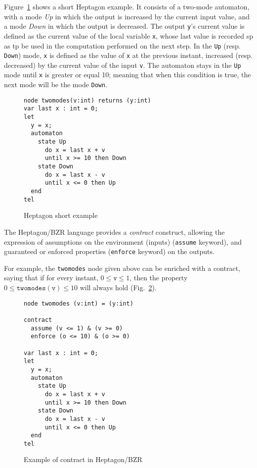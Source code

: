 \documentclass[a4paper]{article}
\begin{document}
Figure~\ref{fig:hept-exple} shows a short Heptagon example. It
consists of a two-mode automaton, with a mode \emph{Up} in which the
output is increased by the current input value, and a mode \emph{Down}
in which the output is decreased.  The output \texttt{y}'s current
value is defined as the current value of the local variable
\texttt{x}, whose last value is recorded sp as tp be used in the
computation performed on the next step. In the \texttt{Up}
(resp. \texttt{Down}) mode, \texttt{x} is defined as the value of
\texttt{x} at the previous instant, increased (resp. decreased) by the
current value of the input \texttt{v}. The automaton stays in the
\texttt{Up} mode until \texttt{x} is greater or equal 10; meaning that
when this condition is true, the next mode will be the mode
\texttt{Down}.

\begin{figure}[hbp]
  \centering
\begin{lstlisting}
node twomodes(v:int) returns (y:int)
var last x : int = 0;
let
  y = x;
  automaton
    state Up
      do x = last x + v
      until x >= 10 then Down
    state Down
      do x = last x - v
      until x <= 0 then Up
  end
tel
\end{lstlisting}

  \caption{Heptagon short example}
  \label{fig:hept-exple}
\end{figure}

The Heptagon/BZR language provides a \emph{contract} construct,
allowing the expression of assumptions on the environment (inputs)
(\texttt{assume} keyword), and guaranteed or enforced properties
(\texttt{enforce} keyword) on the outputs.

For example, the \texttt{twomodes} node given above can be enriched
with a contract, saying that if for every instant, $0 \leq \mathtt{v}
\leq 1$, then the property $0 \leq \mathtt{twomodes(v)} \leq 10$ will always hold (Fig.~\ref{fig:exple-contract}).

\begin{figure}[htbp]
  \centering
\begin{lstlisting}
node twomodes (v:int) = (y:int)

contract
  assume (v <= 1) & (v >= 0)
  enforce (o <= 10) & (o >= 0)

var last x : int = 0;
let
  y = x;
  automaton
    state Up
      do x = last x + v
      until x >= 10 then Down
    state Down
      do x = last x - v
      until x <= 0 then Up
  end
tel
\end{lstlisting}
  \caption{Example of contract in Heptagon/BZR}
  \label{fig:exple-contract}
\end{figure}
\end{document}
